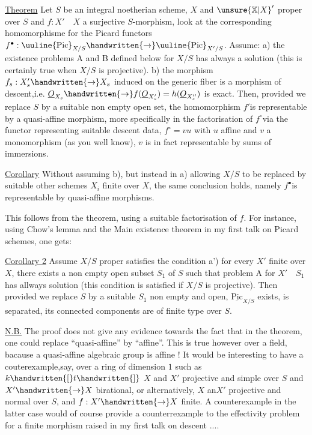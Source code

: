 \uline{Theorem} Let $S$ be an integral noetherian scheme, $X$ and $\unsure{\mathbb{X}|X}'$ proper over $S$ and $f:X'\quad X$ a surjective $S$-morphism, look at the corresponding homomorphisme for the Picard functors $f^{\bullet}:\text{\uuline{Pic}}_{X/S}\handwritten{\to}\text{\uuline{Pic}}_{X'/S}$. Assume: a) the existence problems A and B defined below for $X/S$ has always a solution (this is certainly true when $X/S$ is projective). b) the morphism $f_{s}:X'_{s}\handwritten{\to}X_{s}$ induced on the generic fiber is a morphism of descent,i.e. $\underline{O}_{X_{s}}\handwritten{\to}f(\underline{O}_{X'_{s}})=h(\underline{O}_{X''_{s}})$ is exact. Then, provided we replace $S$ by a suitable non empty open set, the homomorphism $f'$is representable by a quasi-affine morphism, more specifically \unsure{:|;} in the factorisation of $f^{\circ}$via the functor representing suitable descent data, $f^{\circ}=vu$ with $u$ affine and $v$ a monomorphism (as you well know), $v$ is in fact representable by   sums of immersions.

\uline{Corollary} Without assuming b), but instead in a) allowing $X/S$ to be replaced by suitable other schemes $X_{i}$ finite over $X$, the same conclusion  holds, namely $f^{\bullet}$is representable by quasi-affine morphisms.

This follows from the theorem, using a suitable factorisation of $f$. For instance, using Chow's lemma and the Main existence theorem in my first talk on Picard schemes, one gets:

\uline{Corollary 2} Assume $X/S$ proper satisfies the condition a') for every $X'$ finite over $X$, there exists a non empty open subset $S_{1}$ of $S$ such that problem A for $X'\quad S_{1}$ has allways solution  (this condition is satisfied if $X/S$ is projective). Then provided we replace $S$ by a suitable $S_{1}$ non empty and open, $\underline{\mathrm{Pic}}_{X/S}$ exists, is separated, its connected components are of finite type over $S$.

\uline{N.B.} The proof does not give any evidence towards the fact that in
the theorem, one could replace ``quasi-affine'' by ``affine''. This is true however over a field, bacause a quasi-affine algebraic group is affine ! It would be interesting to have a couterexample,say, over a ring of dimension $1$ such as $k\handwritten{[}t\handwritten{]}$\handwritten{,} $X$ and $X'$ projective and simple over $S$ and $X'\handwritten{\to}X$ birational, or alternatively, $X$ an$X'$ projective and normal over $S$, and $f:X'\handwritten{\to}X$ finite. A counterexample in the latter case would of course provide a counterrexample to the effectivity problem for a finite morphism raised in my first talk on descent ....


